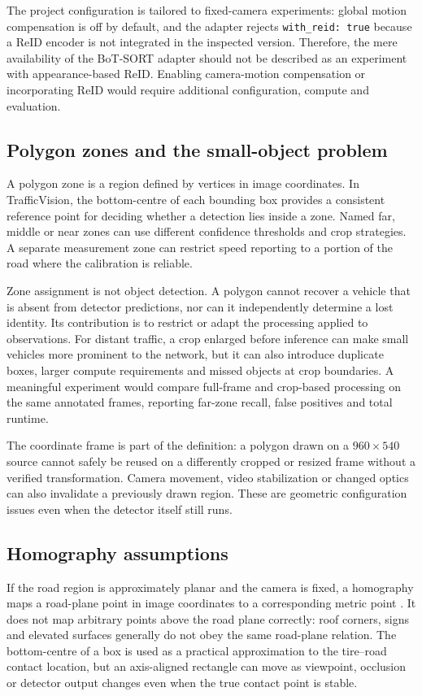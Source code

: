 The project configuration is tailored to fixed-camera experiments: global motion compensation is off by default, and the adapter rejects \texttt{with\_reid: true} because a ReID encoder is not integrated in the inspected version. Therefore, the mere availability of the BoT-SORT adapter should not be described as an experiment with appearance-based ReID. Enabling camera-motion compensation or incorporating ReID would require additional configuration, compute and evaluation.

\subsection{Polygon zones and the small-object problem}
A polygon zone is a region defined by vertices in image coordinates. In TrafficVision, the bottom-centre of each bounding box provides a consistent reference point for deciding whether a detection lies inside a zone. Named far, middle or near zones can use different confidence thresholds and crop strategies. A separate measurement zone can restrict speed reporting to a portion of the road where the calibration is reliable.

Zone assignment is not object detection. A polygon cannot recover a vehicle that is absent from detector predictions, nor can it independently determine a lost identity. Its contribution is to restrict or adapt the processing applied to observations. For distant traffic, a crop enlarged before inference can make small vehicles more prominent to the network, but it can also introduce duplicate boxes, larger compute requirements and missed objects at crop boundaries. A meaningful experiment would compare full-frame and crop-based processing on the same annotated frames, reporting far-zone recall, false positives and total runtime.

The coordinate frame is part of the definition: a polygon drawn on a $960\times540$ source cannot safely be reused on a differently cropped or resized frame without a verified transformation. Camera movement, video stabilization or changed optics can also invalidate a previously drawn region. These are geometric configuration issues even when the detector itself still runs.

\subsection{Homography assumptions}
If the road region is approximately planar and the camera is fixed, a homography maps a road-plane point in image coordinates to a corresponding metric point \cite{opencvhomography}. It does not map arbitrary points above the road plane correctly: roof corners, signs and elevated surfaces generally do not obey the same road-plane relation. The bottom-centre of a box is used as a practical approximation to the tire--road contact location, but an axis-aligned rectangle can move as viewpoint, occlusion or detector output changes even when the true contact point is stable.

